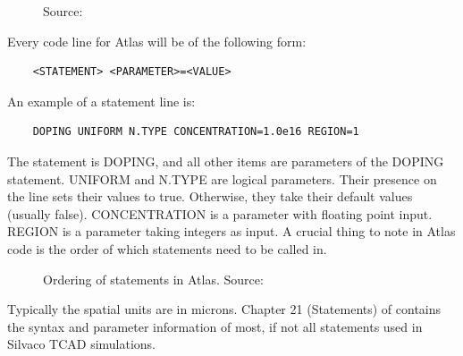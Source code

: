 \documentclass[11pt]{article}
\begin{document}
\begin{figure}[h]
    \centering
    \caption{Source: \cite{silvaco-atlas}}
    \label{fig:atlas-workflow}
\end{figure}
Every code line for Atlas will be of the following form: 
\begin{verbatim}
    <STATEMENT> <PARAMETER>=<VALUE>
\end{verbatim}
An example of a statement line is: 
\begin{verbatim}
    DOPING UNIFORM N.TYPE CONCENTRATION=1.0e16 REGION=1
\end{verbatim} 
The statement is DOPING, and all other items are parameters of the DOPING statement. UNIFORM and N.TYPE are logical parameters. Their presence on the line sets their values to true. Otherwise, they take their default values (usually false). CONCENTRATION is a parameter with floating point input. REGION is a parameter taking integers as input.
\newline A crucial thing to note in Atlas code is the order of which statements need to be called in. 
\begin{figure}[h]
    \centering
    \caption[]{Ordering of statements in Atlas. Source: \cite{silvaco-atlas}}
    \label{fig:atlas-statement-order}
\end{figure}
Typically the spatial units are in microns.
\newline Chapter 21 (Statements) of \cite{silvaco-atlas} contains the syntax and parameter information of most, if not all statements used in Silvaco TCAD simulations.
\end{document}

